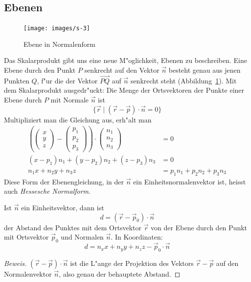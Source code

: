 \subsection{Ebenen}
\begin{figure}
\begin{center}
\texttt{[image: images/s-3]}
\end{center}
\caption{Ebene in Normalenform\label{image-normalenform}}
\end{figure}
Das Skalarprodukt gibt uns eine neue M"oglichkeit, Ebenen zu
beschreiben.
Eine Ebene durch den Punkt $P$ senkrecht auf den Vektor
$\vec n$ besteht genau aus jenen Punkten $Q$, f"ur die der Vektor
$\overset{\rightarrow}{PQ}$ auf $\vec n$ senkrecht steht
(Abbildung~\ref{image-normalenform}).
Mit dem Skalarprodukt
ausgedr"uckt: Die Menge der Ortsvektoren der Punkte einer Ebene durch $P$ mit
Normale $\vec n$ ist
\[
\{\vec r\;|\;(\vec r-\vec p)\cdot \vec n=0\}
\]
Multipliziert man die Gleichung aus, erh"alt man
\begin{align*}
\left(
\begin{pmatrix}x\\y\\z\end{pmatrix}
-\begin{pmatrix}p_1\\p_2\\p_3\end{pmatrix}\right)\cdot
\begin{pmatrix}n_1\\n_2\\n_3\end{pmatrix}&=0
\\
(x-p_1)n_1+(y-p_2)n_2+(z-p_3)n_3&=0
\\
n_1x+n_2y+n_3z&=p_1n_1+p_2n_2+p_3n_3
\end{align*}
Diese Form der Ebenengleichung, in der $\vec n$ ein Einheitsnormalenvektor ist,
heisst auch {\em Hessesche Normalform}.

\begin{satz}
Ist $\vec n$ ein Einheitsvektor, dann ist
\[
d=(\vec r-\vec p_0)\cdot \vec n
\]
der Abstand des Punktes mit dem Ortsvektor $\vec r$ von der Ebene durch
den Punkt mit Ortsvektor $\vec p_0$ und Normalen $\vec n$.
In Koordinaten:
\[
d=n_xx+n_yy+n_zz-\vec p_0\cdot\vec n
\]
\end{satz}
\begin{proof}[Beweis]
$(\vec r-\vec p)\cdot \vec n$ ist die L"ange der Projektion des Vektors
$\vec r -\vec p$ auf den Normalenvektor $\vec n$, also genau der behauptete
Abstand.
\end{proof}

